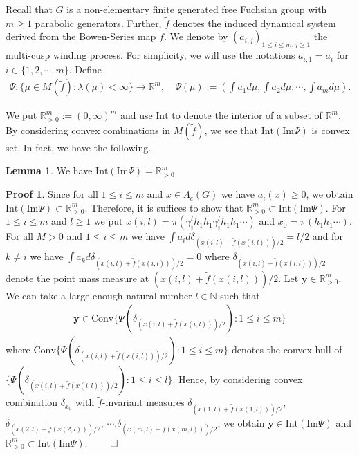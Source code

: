 \documentclass{article}
\theoremstyle{definition}
\newtheorem{lemma}[thm]{Lemma}
\newtheorem*{pf}{Proof}
\begin{document}
Recall that $G$ is a non-elementary finite generated free Fuchsian group with $m\geq 1$ parabolic generators. Further, $\tilde f$ denotes the induced dynamical system derived from the Bowen-Series map $f$. We denote by $(a_{i,j})_{1\leq i\leq m,j\geq1}$ the multi-cusp winding process. For simplicity, we will use the notations $a_{i,1}=a_i$ for $i\in\lbrace1,2,\cdots,m\rbrace$. Define 
\begin{align}
    \Psi: \lbrace \mu \in {M}({\tilde f}): \lambda(\mu)<\infty \rbrace \rightarrow \mathbb{R}^m,\quad\Psi(\mu):=\left(\int a_1 d\mu,\int a_2 d\mu,\cdots,\int a_m d\mu\right).\nonumber
\end{align}

We put $\mathbb{R}^m_{>0}:=(0,\infty)^m$ and use $\text{Int}$ to denote the interior of a subset of  $\mathbb{R}^m$. 
By considering convex combinations in ${M}({\tilde f})$, we see that $\text{Int}(\text{Im}\Psi)$ is convex set.
In fact, we have the following. 
\begin{lemma}\label{imformation of U}
    We have $\text{Int}(\text{Im}\Psi)=\mathbb{R}^m_{>0}$.
\end{lemma}
\begin{pf}
 Since for all $1\leq i\leq m$ and $x\in\Lambda_c(G)$ we have $a_i(x)\geq0$, we obtain $\text{Int}(\text{Im}\Psi)\subset\mathbb{R}^m_{>0}$. Therefore, it is suffices to show that $\mathbb{R}^m_{>0}\subset \text{Int}(\text{Im}\Psi)$. For $1\leq i \leq m$ and $l\geq1$ we put $x({i,l})=\pi(\gamma_i^lh_1h_1\gamma_i^lh_1h_1\cdots)$ and $x_0=\pi(h_1h_1\cdots)$. For all $M>0$ and $1\leq i\leq m$ we have $\int a_i d\delta_{(x({i,l})+\tilde f(x({i,l})
))/2}=l/2$ and for $k\neq i$ we have $\int a_k d\delta_{(x({i,l})+\tilde f(x({i,l})))/2}=0$ where $\delta_{(x({i,l})+\tilde f(x({i,l})))/2}$ denote the point mass measure at ${(x({i,l})+\tilde f(x({i,l})))/2}$. Let $\boldsymbol{y}\in\mathbb{R}^m_{>0}$. We can take a large enough natural number $l\in\mathbb{N}$ such that  
\begin{align*}
\boldsymbol{y}\in\text{Conv}\{\Psi(\delta_{(x({i,l})+\tilde f(x({i,l})))/2}):1\leq i\leq m\}
\end{align*}
where $\text{Conv}\{\Psi(\delta_{(x({i,l})+\tilde f(x({i,l})))/2}):1\leq i\leq m\}$ denotes the convex hull of $\{\Psi(\delta_{(x({i,l})+\tilde f(x({i,l})))/2}):1\leq i\leq l\}$. Hence, by considering convex combination $\delta_{x_0}$ with $\tilde f$-invariant measures $\delta_{(x({1,l})+\tilde f(x({1,l})))/2}$, $\delta_{(x({2,l})+\tilde f(x({2,l})))/2}$, $\cdots$,$\delta_{(x({m,l})+\tilde f(x({m,l})))/2}$, we obtain $\boldsymbol{y} \in \text{Int}(\text{Im}\Psi)$ and $\mathbb{R}_{>0}^m\subset \text{Int}(\text{Im}\Psi)$.   $\qed$
\end{pf}
\end{document}
